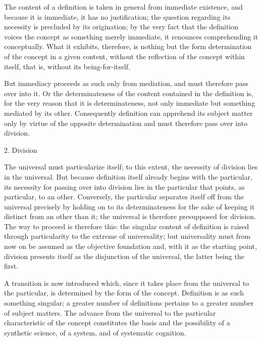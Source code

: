 The content of a definition is taken
in general from immediate existence,
and because it is immediate,
it has no justification;
the question regarding its necessity is
precluded by its origination;
by the very fact that the definition voices
the concept as something merely immediate,
it renounces comprehending it conceptually.
What it exhibits, therefore, is nothing but
the form determination of the concept in a given content,
without the reflection of the concept within itself,
that is, without its being-for-itself.

But immediacy proceeds as such only from mediation,
and must therefore pass over into it.
Or the determinateness of the content
contained in the definition is,
for the very reason that it is determinateness,
not only immediate but something mediated by its other.
Consequently definition can apprehend its subject matter
only by virtue of the opposite determination
and must therefore pass over into division.

2. Division

The universal must particularize itself;
to this extent, the necessity of division lies in the universal.
But because definition itself already begins with the particular,
its necessity for passing over into division lies in
the particular that points, as particular, to an other.
Conversely, the particular separates itself off
from the universal precisely by holding on to its determinateness
for the sake of keeping it distinct from an other than it;
the universal is therefore presupposed for division.
The way to proceed is therefore this:
the singular content of definition is
raised through particularity to the extreme of universality;
but universality must from now on
be assumed as the objective foundation
and, with it as the starting point,
division presents itself as
the disjunction of the universal,
the latter being the first.

A transition is now introduced which,
since it takes place from the universal to the particular,
is determined by the form of the concept.
Definition is as such something singular;
a greater number of definitions pertains to
a greater number of subject matters.
The advance from the universal to the particular
characteristic of the concept constitutes
the basis and the possibility of a synthetic science,
of a system, and of systematic cognition.

